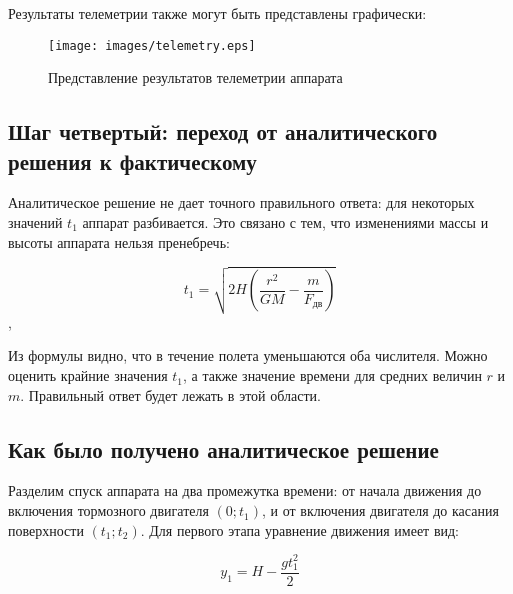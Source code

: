 \documentclass[12pt,a4paper]{article}
\begin{document}
Результаты телеметрии также могут быть представлены графически:

\begin{figure}[tbh]
  \begin{center}
    \texttt{[image: images/telemetry.eps]}
    \caption{Представление результатов телеметрии аппарата}
    \label{Pic:telemetry}
  \end{center}
\end{figure}

\hfill

\noindent{}

\subsection{Шаг четвертый: переход от аналитического решения к фактическому}

Аналитическое решение не дает точного правильного ответа: для некоторых значений $t_1$
аппарат разбивается. Это связано с тем, что изменениями массы и высоты аппарата нельзя
пренебречь:

$$ t_1 = \sqrt{2 H \left(\frac{r^2}{G M} - \frac{m}{F_{\text{дв}}}\right)} $$,

Из формулы видно, что в течение полета уменьшаются оба числителя. Можно оценить крайние
значения $t_1$, а также значение времени для средних величин $r$ и $m$. Правильный ответ будет
лежать в этой области.

\hfill

\noindent{}

\subsection{Как было получено аналитическое решение}
\label{Sec:Moon-Model}

Разделим спуск аппарата на два промежутка времени: от начала движения до включения
тормозного двигателя $(0; t_1)$, и от включения двигателя до касания поверхности $(t_1;
t_2)$. Для первого этапа уравнение движения имеет вид:

$$
y_1 = H - \frac{g t^2_1}{2}
$$
\end{document}
